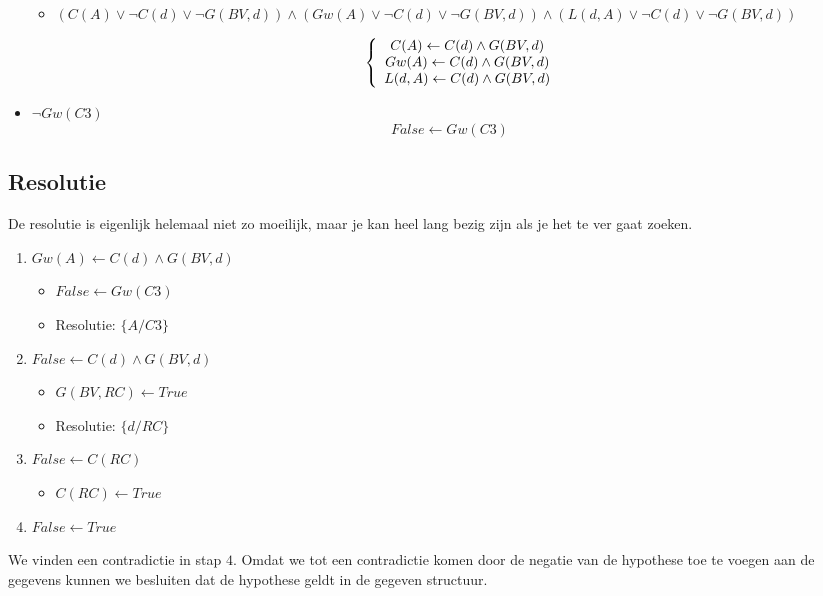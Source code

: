 \documentclass[alternative-exam.tex]{subfiles}
\begin{document}
\begin{itemize}
\begin{itemize}
\item 
$(C(A)\vee \neg C(d) \vee \neg G(BV,d)) \wedge (Gw(A)\vee  \neg C(d) \vee \neg G(BV,d)) \wedge (L(d,A) \vee \neg C(d) \vee \neg G(BV,d))$

\[
\left\{
\begin{array}{c c c}
C(A)\leftarrow  C(d) \wedge  G(BV,d)\\
Gw(A) \leftarrow  C(d) \wedge  G(BV,d)\\
L(d,A) \leftarrow C(d) \wedge G(BV,d)\\
\end{array}
\right.
\]
\end{itemize}

\item $\neg Gw(C3)$
\[
False \leftarrow Gw(C3)
\]
\end{itemize}

\subsection{Resolutie}
De resolutie is eigenlijk helemaal niet zo moeilijk, maar je kan heel lang bezig zijn als je het te ver gaat zoeken.

\begin{enumerate}

\item $Gw(A) \leftarrow C(d) \wedge G(BV,d)$
\begin{itemize}
\item $False \leftarrow Gw(C3)$
\item Resolutie: $\{ A/C3\}$
\end{itemize}

\item $False \leftarrow C(d) \wedge G(BV,d)$
\begin{itemize}
\item $G(BV,RC) \leftarrow True$
\item Resolutie: $\{ d/RC\}$
\end{itemize}

\item $False \leftarrow C(RC)$
\begin{itemize}
\item $C(RC) \leftarrow True$
\end{itemize}

\item $False \leftarrow True$
\end{enumerate}
We vinden een contradictie in stap $4$. Omdat we tot een contradictie komen door de negatie van de hypothese toe te voegen aan de gegevens kunnen we besluiten dat de hypothese geldt in de gegeven structuur.
\end{document}
